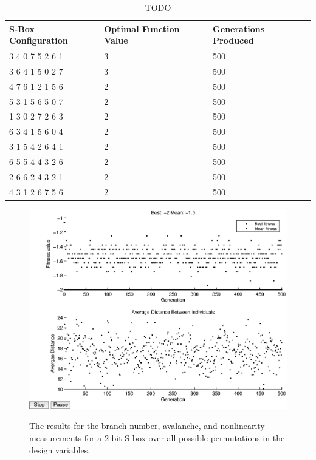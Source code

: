 \documentclass[11pt]{article}
\begin{document}
\begin{table}
	\centering
	\label{bnTable}
	\caption{TODO}
    \begin{tabular}{|l|l|l|}
        \hline
        S-Box Configuration & Optimal Function Value & Generations Produced \\ \hline
        3     4     0     7     5     2     6     1 & 3 & 500 \\ 
	3     6     4     1     5     0     2     7 & 3 & 500 \\ 
        4     7     6     1     2     1     5     6 & 2 & 500 \\ 
        5     3     1     5     6     5     0     7 & 2 & 500 \\ 
        1     3     0     2     7     2     6     3 & 2 & 500 \\ 
        6     3     4     1     5     6     0     4 & 2 & 500 \\ 
        3     1     5     4     2     6     4     1 & 2 & 500 \\ 
        6     5     5     4     4     3     2     6 & 2 & 500 \\ 
        2     6     6     2     4     3     2     1 & 2 & 500 \\ 
        4     3     1     2     6     7     5     6 & 2 & 500 \\
        \hline
    \end{tabular}
\end{table}

\begin{figure}
	\centering
	\includegraphics[scale=0.5]{images/bn_results16.eps} \\
	\label{bn16}
\caption{The results for the branch number, avalanche, and nonlinearity measurements for a $2$-bit S-box over all possible permutations in the design variables. }
\end{figure}
\end{document}
